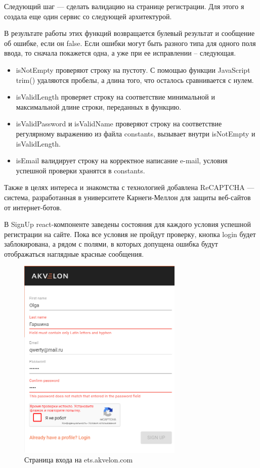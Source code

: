 \documentclass[a4paper,12pt]{diplom}
\begin{document}
Следующий шаг — сделать валидацию на странице регистрации. Для этого я создала еще один сервис со следующей архитектурой.
\medskip
{}
\medskip

В результате работы этих функций возвращается булевый результат и сообщение об ошибке, если он false.
Если ошибки могут быть разного типа для одного поля ввода, то сначала покажется одна, а уже при ее исправлении -- следующая.
\medskip

\begin{itemize}
\item isNotEmpty проверяют строку на пустоту. С помощью функции JavaScript trim() удаляются пробелы, а длина того, что осталось сравнивается с нулем.
\item isValidLength проверяет строку на соответствие минимальной и максимальной длине строки, переданных в функцию.
\item isValidPassword и isValidName проверяют строку на соответствие регулярному выражению из файла constants, вызывает внутри isNotEmpty и isValidLength.
\item isEmail валидирует строку на корректное написание e-mail, условия успешной проверки хранятся в constants.
\end{itemize}

Также в целях интереса и знакомства с технологией добавлена ReCAPTCHA — система, разработанная в университете Карнеги-Меллон для защиты веб-сайтов от интернет-ботов.

В SignUp react-компоненте заведены состояния для каждого условия успешной регистрации на сайте. Пока все условия не пройдут проверку, кнопка login будет заблокирована,
а рядом с полями, в которых допущена ошибка будут отображаться наглядные красные сообщения.

\begin{figure}[!ht]
\centering
\includegraphics[width=0.7\textwidth]{resources/signup.png}
\caption{Страница входа на ets.akvelon.com}
\label{fig:1}
\end{figure}
\end{document}
